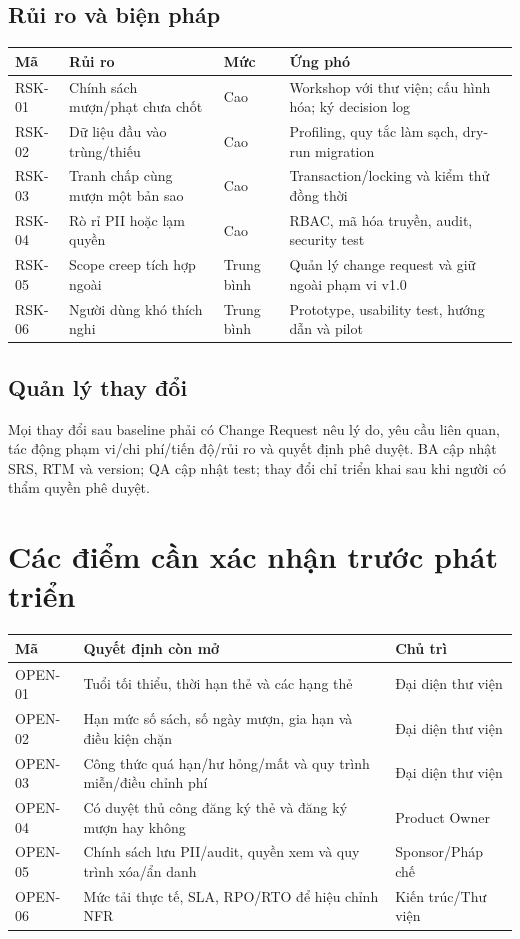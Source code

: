 \documentclass[12pt,a4paper,oneside]{report}
\begin{document}
\section{Rủi ro và biện pháp}
\begin{longtable}{L{1.7cm}L{4.9cm}L{1.7cm}L{5.2cm}}
\toprule Mã & Rủi ro & Mức & Ứng phó\\\midrule\endhead
RSK-01 & Chính sách mượn/phạt chưa chốt & Cao & Workshop với thư viện; cấu hình hóa; ký decision log\\
RSK-02 & Dữ liệu đầu vào trùng/thiếu & Cao & Profiling, quy tắc làm sạch, dry-run migration\\
RSK-03 & Tranh chấp cùng mượn một bản sao & Cao & Transaction/locking và kiểm thử đồng thời\\
RSK-04 & Rò rỉ PII hoặc lạm quyền & Cao & RBAC, mã hóa truyền, audit, security test\\
RSK-05 & Scope creep tích hợp ngoài & Trung bình & Quản lý change request và giữ ngoài phạm vi v1.0\\
RSK-06 & Người dùng khó thích nghi & Trung bình & Prototype, usability test, hướng dẫn và pilot\\
\bottomrule
\end{longtable}

\section{Quản lý thay đổi}
Mọi thay đổi sau baseline phải có Change Request nêu lý do, yêu cầu liên quan, tác động phạm vi/chi phí/tiến độ/rủi ro và quyết định phê duyệt. BA cập nhật SRS, RTM và version; QA cập nhật test; thay đổi chỉ triển khai sau khi người có thẩm quyền phê duyệt.

\chapter{Các điểm cần xác nhận trước phát triển}
\begin{longtable}{L{2cm}L{8cm}L{4.5cm}}
\toprule Mã & Quyết định còn mở & Chủ trì\\\midrule\endhead
OPEN-01 & Tuổi tối thiểu, thời hạn thẻ và các hạng thẻ & Đại diện thư viện\\
OPEN-02 & Hạn mức số sách, số ngày mượn, gia hạn và điều kiện chặn & Đại diện thư viện\\
OPEN-03 & Công thức quá hạn/hư hỏng/mất và quy trình miễn/điều chỉnh phí & Đại diện thư viện\\
OPEN-04 & Có duyệt thủ công đăng ký thẻ và đăng ký mượn hay không & Product Owner\\
OPEN-05 & Chính sách lưu PII/audit, quyền xem và quy trình xóa/ẩn danh & Sponsor/Pháp chế\\
OPEN-06 & Mức tải thực tế, SLA, RPO/RTO để hiệu chỉnh NFR & Kiến trúc/Thư viện\\
\bottomrule
\end{longtable}
\end{document}
